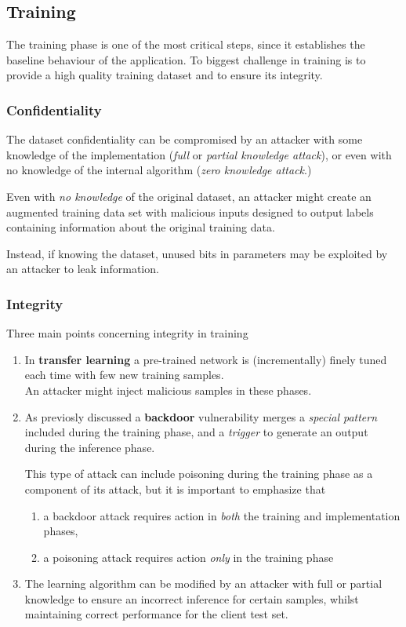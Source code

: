 \subsection{Training}
The training phase is one of the most critical steps, since it establishes the baseline behaviour of the application.
To biggest challenge in training is to provide a high quality training dataset and to ensure its integrity.
\subsubsection{Confidentiality}
The dataset confidentiality can be compromised by an attacker with some knowledge of the implementation (\textit{full} or \textit{partial knowledge attack}),
or even with no knowledge of the internal algorithm (\textit{zero knowledge attack}.)

Even with \textit{no knowledge} of the original dataset, an attacker might create an augmented training data set with malicious inputs designed to output labels containing information about
the original training data.

Instead, if knowing the dataset, unused bits in parameters may be exploited by an attacker to leak information.

\subsubsection{Integrity}
Three main points concerning integrity in training

\begin{enumerate}
   \item In \textbf{transfer learning} a pre-trained network is (incrementally) finely tuned each time with few new training samples.\\
   An attacker might inject malicious samples in these phases.
   
   \item
   As previosly discussed a \textbf{backdoor} vulnerability merges a \textit{special pattern} included during the training
   phase, and a \textit{trigger} to generate an output during the inference phase.
   
   This type of attack can include poisoning during the training phase as a
   component of its attack, but it is important to emphasize that
   \begin{enumerate}
      \item a backdoor attack requires action in \textit{both} the training and implementation
      phases,
      \item a poisoning attack requires action \textit{only} in the training phase
   \end{enumerate}

   \item The learning algorithm can be modified by an attacker with full or partial knowledge to ensure an incorrect inference for certain samples, whilst maintaining correct performance for the client test set.
\end{enumerate}

